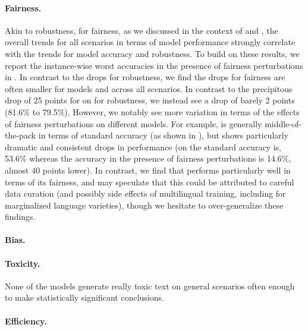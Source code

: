 \paragraph{Fairness.}
%

Akin to robustness, for fairness, as we discussed in the context of  and , the overall trends for all scenarios in terms of model performance strongly correlate with the trends for model accuracy and robustness.
To build on these results, we report the instance-wise worst accuracies in the presence of fairness perturbations in .
In contrast to the drops for robustness, we find the drops for fairness are often smaller for models and across all scenarios.
In contrast to the precipitous drop of 25 points for \optonesevenfive on \boolq for robustness, we instead see a drop of barely 2 points (81.6\% to 79.5\%).
However, we notably see more variation in terms of the effects of fairness perturbations on different models.
For example, \yalm is generally middle-of-the-pack in terms of standard accuracy (as shown in ), but shows particularly dramatic and consistent drops in performance (\eg on \narrativeqa the standard accuracy is,  53.6\% whereas the accuracy in the presence of fairness perturbations is 14.6\%, almost 40 points lower). 
In contrast, we find that \bloom performs particularly well in terms of its fairness, and may speculate that this could be attributed to careful data curation (and possibly side effects of multilingual training, including for marginalized language varieties), though we hesitate to over-generalize these findings. 

\paragraph{Bias.}

\paragraph{Toxicity.}
None of the models generate really toxic text on general scenarios often enough to make statistically significant conclusions.

\paragraph{Efficiency.}
